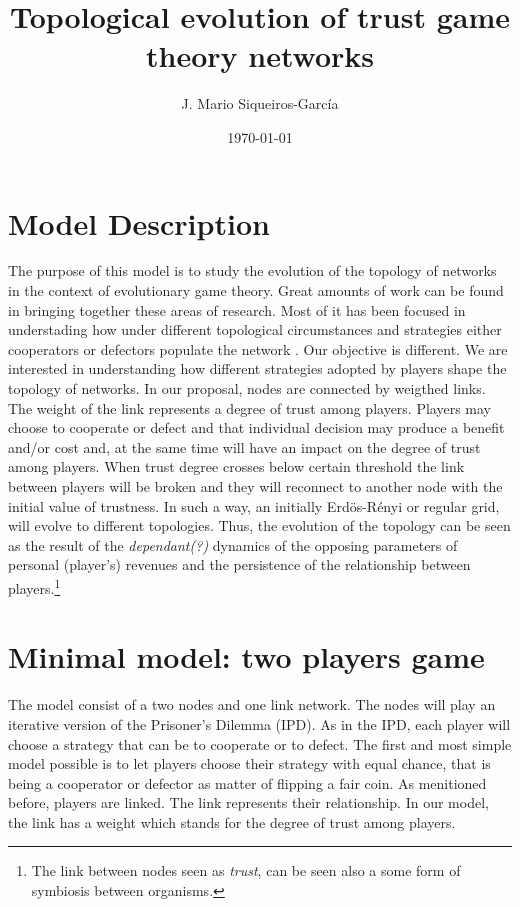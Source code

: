 \documentclass[11pt]{article}
\author{J. Mario Siqueiros-Garc\'ia}
\title{Topological evolution of trust game theory networks}
\date{\today}
\begin{document}
\maketitle

\section{Model Description}

The purpose of this model is to study the evolution of the topology of networks in the context of evolutionary game theory. Great amounts of work can be found in bringing together these areas of
research. Most of it has been focused in understading how under different topological circumstances and strategies either cooperators or defectors populate the network \cite{Nowak1992, Hauert2004, Santos2005, Nowak2011}. Our objective is different. We are interested in understanding how different strategies adopted by players shape the topology of networks. In our proposal,  nodes are connected by weigthed links. The weight of the link represents a degree of trust among players. Players may choose to cooperate or defect and that individual decision may produce  a benefit and/or cost and, at the same time will have an impact on the degree of trust among players. When trust degree crosses below certain threshold the link between players will be broken and they will reconnect to another node with the initial value of trustness. In such a way, an initially Erd\"{o}s-R\'enyi or regular grid, will evolve to different topologies. Thus, the evolution of the topology can be seen as the result of the \emph{dependant(?)} dynamics of the opposing parameters of personal (player's) revenues and the persistence of the relationship between players.\footnote{The link between nodes seen as \emph{trust}, can be seen also a some form of symbiosis between organisms.}


\section{Minimal model: two players game}
The model consist of a two nodes and one link network. The nodes will play an iterative version of the Prisoner's Dilemma (IPD). As in the IPD, each player will choose a strategy that can be to cooperate or to defect. The first and most simple model possible is to let players choose their strategy with equal chance, that is being a cooperator or defector as matter of flipping a fair coin. As menitioned before, players are linked. The link represents their relationship. In our model, the link has a weight which stands for the degree of trust among players.\\
\end{document}
